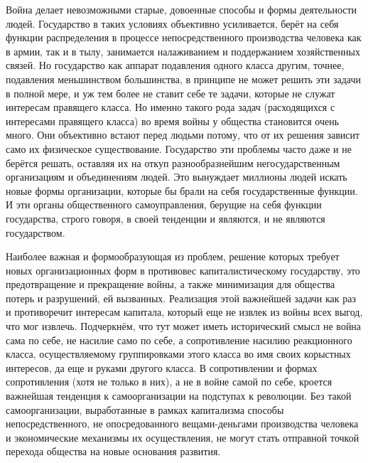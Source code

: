 \documentclass[../main]{subfiles}
\begin{document}
Война делает невозможными старые, довоенные способы и формы деятельности людей. Государство в таких условиях объективно усиливается, берёт на себя функции распределения в процессе непосредственного производства человека как в армии, так и в тылу, занимается налаживанием и поддержанием хозяйственных связей. Но государство как аппарат подавления одного класса другим, точнее, подавления меньшинством большинства, в принципе не может решить эти задачи в полной мере, и уж тем более не ставит себе те задачи, которые не служат интересам правящего класса. Но именно такого рода задач (расходящихся с интересами правящего класса) во время войны у общества становится очень много. Они объективно встают перед людьми потому, что от их решения зависит само их физическое существование. Государство эти проблемы часто даже и не берётся решать, оставляя их на откуп разнообразнейшим негосударственным организациям и объединениям людей. Это вынуждает миллионы людей искать новые формы организации, которые бы брали на себя государственные функции. И эти органы общественного самоуправления, берущие на себя функции государства, строго говоря, в своей тенденции и являются, и не являются государством.

Наиболее важная и формообразующая из проблем, решение которых требует новых организационных форм в противовес капиталистическому государству, это предотвращение и прекращение войны, а также минимизация для общества потерь и разрушений, ей вызванных. Реализация этой важнейшей задачи как раз и противоречит интересам капитала, который еще не извлек из войны всех выгод, что мог извлечь. Подчеркнём, что тут может иметь исторический смысл не война сама по себе, не насилие само по себе, а сопротивление насилию реакционного класса, осуществляемому группировками этого класса во имя своих корыстных интересов, да еще и руками другого класса. В сопротивлении и формах сопротивления (хотя не только в них), а не в войне самой по себе, кроется важнейшая тенденция к самоорганизации на подступах к революции. Без такой самоорганизации, выработанные в рамках капитализма способы непосредственного, не опосредованного вещами-деньгами производства человека и экономические механизмы их осуществления, не могут стать отправной точкой перехода общества на новые основания развития.
\end{document}
